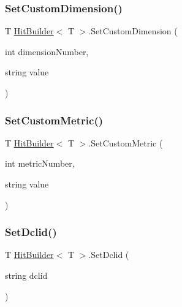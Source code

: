 \mbox{\label{class_hit_builder_a142d3073dedfb4b0d8dd9d44ddc22d30}} 
\subsubsection{\texorpdfstring{Set\+Custom\+Dimension()}{SetCustomDimension()}}
{\footnotesize\ttfamily T \hyperlink{class_hit_builder}{Hit\+Builder}$<$ T $>$.Set\+Custom\+Dimension (\begin{DoxyParamCaption}\item[{int}]{dimension\+Number,  }\item[{string}]{value }\end{DoxyParamCaption})}

\mbox{\label{class_hit_builder_a400ca3be59a49d15453cab6fdc8e0c91}} 
\subsubsection{\texorpdfstring{Set\+Custom\+Metric()}{SetCustomMetric()}}
{\footnotesize\ttfamily T \hyperlink{class_hit_builder}{Hit\+Builder}$<$ T $>$.Set\+Custom\+Metric (\begin{DoxyParamCaption}\item[{int}]{metric\+Number,  }\item[{string}]{value }\end{DoxyParamCaption})}

\mbox{\label{class_hit_builder_a80be85c68138279996d755db2f2e0416}} 
\subsubsection{\texorpdfstring{Set\+Dclid()}{SetDclid()}}
{\footnotesize\ttfamily T \hyperlink{class_hit_builder}{Hit\+Builder}$<$ T $>$.Set\+Dclid (\begin{DoxyParamCaption}\item[{string}]{dclid }\end{DoxyParamCaption})}

